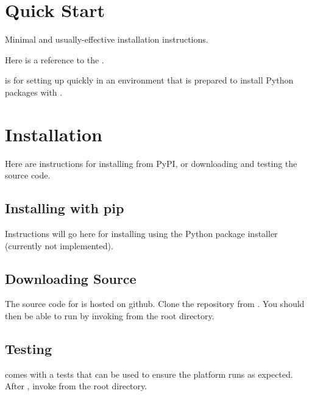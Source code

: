 \documentclass[letterpaper,10pt,english]{sphinxmanual}
\begin{document}
\chapter{Quick Start}
\label{\detokenize{quickstart:sec-quickstart}}\label{\detokenize{quickstart::doc}}\label{\detokenize{quickstart:quick-start}}
Minimal and usually-effective installation instructions.

Here is a reference to the {\hyperref[\detokenize{intro:ch-introduction}]{}}.

{\hyperref[\detokenize{quickstart:sec-quickstart}]{}} is for setting up  quickly
in an environment that is prepared to install Python packages with .


\chapter{Installation}
\label{\detokenize{installation:ch-installation}}\label{\detokenize{installation::doc}}\label{\detokenize{installation:installation}}
Here are instructions for installing  from PyPI,
or downloading and testing the  source code.


\section{Installing with pip}
\label{\detokenize{installation:sec-pip-installation}}\label{\detokenize{installation:installing-with-pip}}
Instructions will go here for installing  using
the Python package installer  (currently not implemented).


\section{Downloading Source}
\label{\detokenize{installation:downloading-source}}\label{\detokenize{installation:sec-src-installation}}
The source code for  is hosted on github.
Clone the repository from .
You should then be able to run  by invoking
 from the root directory.


\section{Testing}
\label{\detokenize{installation:testing}}\label{\detokenize{installation:sec-testing}}
 comes with a tests that can be used
to ensure the platform runs as expected.
After {\hyperref[\detokenize{installation:sec-src-installation}]{}},
invoke 
from the root directory.
\end{document}
